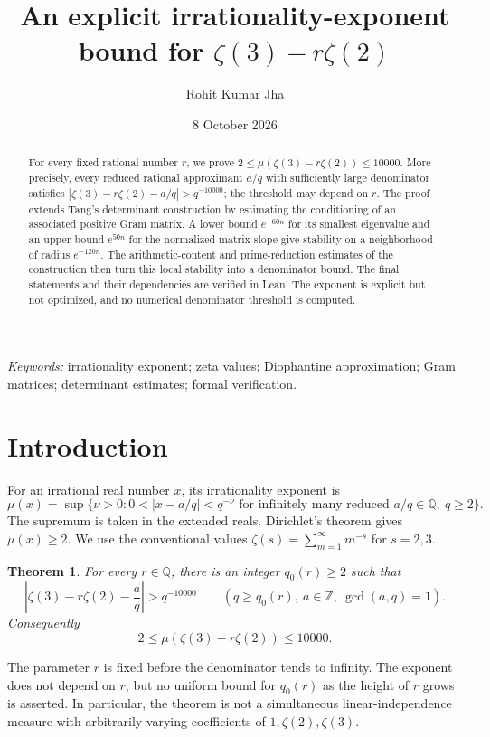 \documentclass[11pt]{article}
\title{An explicit irrationality-exponent bound for
 $\zeta(3)-r\zeta(2)$}
\author{Rohit Kumar Jha}
\date{8 October 2026}
\newtheorem{theorem}{Theorem}[section]
\numberwithin{equation}{section}
\newcommand{\Q}{\mathbb Q}
\newcommand{\Z}{\mathbb Z}
\begin{document}
\maketitle

\begin{abstract}
For every fixed rational number $r$, we prove
$2\leq\mu(\zeta(3)-r\zeta(2))\leq10000$. More precisely, every reduced
rational approximant $a/q$ with sufficiently large denominator satisfies
$|\zeta(3)-r\zeta(2)-a/q|>q^{-10000}$; the threshold may depend on $r$.
The proof extends Tang's determinant construction by estimating the
conditioning of an associated positive Gram matrix. A lower bound
$e^{-60n}$ for its smallest eigenvalue and an upper bound $e^{50n}$ for
the normalized matrix slope give stability on a neighborhood of radius
$e^{-120n}$. The arithmetic-content and prime-reduction estimates of the
construction then turn this local stability into a denominator bound.
The final statements and their dependencies are verified in Lean.
The exponent is explicit but not optimized, and no numerical denominator
threshold is computed.
\end{abstract}
\noindent\textit{Keywords:} irrationality exponent; zeta values;
Diophantine approximation; Gram matrices; determinant estimates;
formal verification.

\section{Introduction}

For an irrational real number $x$, its irrationality exponent is
\[
 \mu(x)=\sup\{\nu>0:0<|x-a/q|<q^{-\nu}
       \text{ for infinitely many reduced }a/q\in\Q,\ q\geq2\}.
\]
The supremum is taken in the extended reals. Dirichlet's theorem gives
$\mu(x)\geq2$. We use the conventional values
$\zeta(s)=\sum_{m=1}^{\infty}m^{-s}$ for $s=2,3$.

\begin{theorem}\label{thm:main}
For every $r\in\Q$, there is an integer $q_0(r)\geq2$ such that
\begin{equation}\label{eq:main}
 \left|\zeta(3)-r\zeta(2)-\frac aq\right|>q^{-10000}
 \qquad(q\geq q_0(r),\ a\in\Z,\ \gcd(a,q)=1).
\end{equation}
Consequently
\[
                  2\leq\mu(\zeta(3)-r\zeta(2))\leq10000.
\]
\end{theorem}

The parameter $r$ is fixed before the denominator tends to infinity.
The exponent does not depend on $r$, but no uniform bound for $q_0(r)$
as the height of $r$ grows is asserted. In particular, the theorem is
not a simultaneous linear-independence measure with arbitrarily varying
coefficients of $1,\zeta(2),\zeta(3)$.
\end{document}
